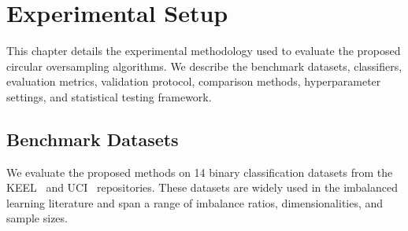 
\chapter{Experimental Setup}
\label{ch:experimental_setup}

This chapter details the experimental methodology used to evaluate the proposed circular oversampling algorithms.
We describe the benchmark datasets, classifiers, evaluation metrics, validation protocol, comparison methods, hyperparameter settings, and statistical testing framework.


\section{Benchmark Datasets}
\label{sec:setup:datasets}

We evaluate the proposed methods on 14 binary classification datasets from the KEEL~\cite{alcala2011keel} and UCI~\cite{uci2017} repositories.
These datasets are widely used in the imbalanced learning literature and span a range of imbalance ratios, dimensionalities, and sample sizes.

